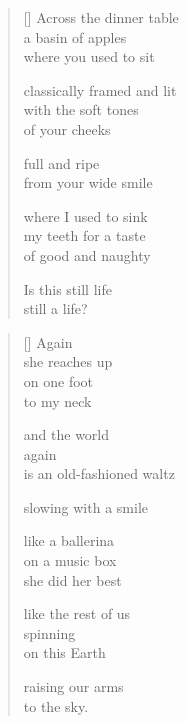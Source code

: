 \documentclass[14pt]{extbook}
\newcommand*{\centeredornament}{\centerline{\pgfornament[width=6cm]{88}}}
\begin{document}

\newpage

\vspace*{-15mm}
\centeredornament
\vspace*{-7mm}


\settowidth{\versewidth}{classically framed and lit}

\begin{verse}[\versewidth]
  Across the dinner table \\
  a basin of apples \\
  where you used to sit

  classically framed and lit \\
  with the soft tones \\
  of your cheeks

  full and ripe \\
  from your wide smile

  where I used to sink \\
  my teeth for a taste \\
  of good and naughty

  Is this still life \\
  still a life?
\end{verse}


\newpage

\vspace*{-15mm}
\centeredornament
\vspace*{-7mm}


\settowidth{\versewidth}{is an old-fashioned waltz}

\begin{verse}[\versewidth]
  Again \\
  she reaches up \\
  on one foot \\
  to my neck

  and the world \\
  again \\
  is an old-fashioned waltz

  slowing with a smile

  like a ballerina \\
  on a music box \\
  she did her best

  like the rest of us \\
  spinning \\
  on this Earth

  raising our arms \\
  to the sky.
\end{verse}
\end{document}
